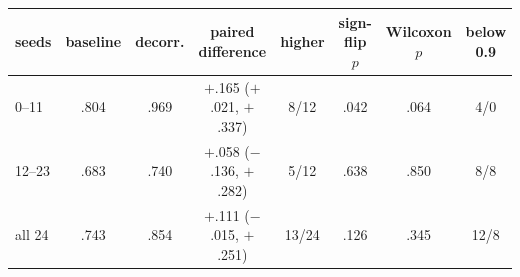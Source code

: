 \begin{tabular}{lccccccc}
\toprule
seeds & baseline & decorr. & paired difference & higher & sign-flip $p$ & Wilcoxon $p$ & below 0.9 \\
\midrule
0--11 & .804 & .969 & $+$.165 ($+$.021, $+$.337) & 8/12 & .042 & .064 & 4/0 \\
12--23 & .683 & .740 & $+$.058 ($-$.136, $+$.282) & 5/12 & .638 & .850 & 8/8 \\
all 24 & .743 & .854 & $+$.111 ($-$.015, $+$.251) & 13/24 & .126 & .345 & 12/8 \\
\bottomrule
\end{tabular}
